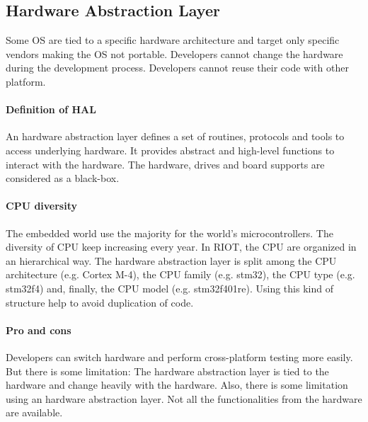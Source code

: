 \subsection{Hardware Abstraction Layer}
Some OS are tied to a specific hardware architecture and target only specific vendors making the OS not portable.
Developers cannot change the hardware during the development process.
Developers cannot reuse their code with other platform.

\paragraph{Definition of HAL}
An hardware abstraction layer defines a set of routines, protocols and tools to access underlying hardware.
It provides abstract and high-level functions to interact with the hardware.
The hardware, drives and board supports are considered as a black-box.


\paragraph{CPU diversity}
The embedded world use the majority for the world's microcontrollers.
The diversity of CPU keep increasing every year.
In RIOT, the CPU are organized in an hierarchical way.
The hardware abstraction layer is split among the CPU architecture (e.g. Cortex M-4), the CPU family (e.g. stm32), the CPU type (e.g. stm32f4) and, finally, the CPU model (e.g. stm32f401re).
Using this kind of structure help to avoid duplication of code.

\paragraph{Pro and cons}
Developers can switch hardware and perform cross-platform testing more easily.
But there is some limitation: The hardware abstraction layer is tied to the hardware and change heavily with the hardware.
Also, there is some limitation using an hardware abstraction layer.
Not all the functionalities from the hardware are available.